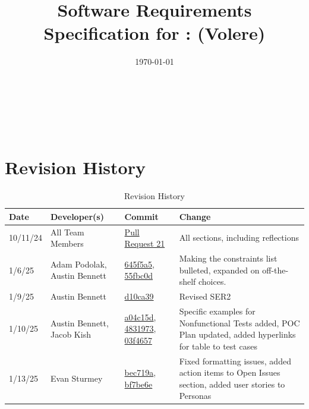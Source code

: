 \documentclass[12pt]{article}
\begin{document}
\title{Software Requirements Specification for \progname: (Volere)} 
\author{\authname}
\date{\today}
	
\maketitle

~\newpage


\tableofcontents

~\newpage

\section*{Revision History}

\begin{table}[H]
\centering
\caption{Revision History}
\label{TblRevisionHistory}
\begin{tabularx}{\textwidth}{p{} p{} p{} p{}}
\toprule
\textbf{Date} & \textbf{Developer(s)} & \textbf{Commit} & \textbf{Change}\\

\midrule
10/11/24 & 
All Team Members & 
\href{https://github.com/ausbennett/mes-finance-platform/pull/21}{Pull Request 21} & 
All sections, including reflections\\

\midrule
1/6/25 & 
Adam Podolak, Austin Bennett & 
\href{https://github.com/ausbennett/mes-finance-platform/commit/645f5a5ecfee7cc2adbb784888d733d815d3080f}{645f5a5}, \href{https://github.com/ausbennett/mes-finance-platform/commit/55fbc0d26a10b56f90c50919de7a8c9ca920ec11}{55fbc0d}  & Making the constraints list bulleted, expanded on off-the-shelf choices. \\

\midrule
1/9/25 & 
Austin Bennett & 
\href{https://github.com/ausbennett/mes-finance-platform/commit/d10ca390135f3c6f5a7b2c8f237c3575501a2a7f}{d10ca39} & 
Revised SER2\\

\midrule
1/10/25 & 
Austin Bennett, Jacob Kish & 
\href{https://github.com/ausbennett/mes-finance-platform/commit/a04c15d0b1c09c4224c563c3293413720992000f}{a04c15d}, 
\href{https://github.com/ausbennett/mes-finance-platform/commit/4831973b5533e5ae9d6ae4e884bd0cfebb49792d}{4831973},
\href{https://github.com/ausbennett/mes-finance-platform/commit/03f46579d128fbf9c896b3c4cba2601181f4d5c1}{03f4657} & 
Specific examples for Nonfunctional Tests added, POC Plan updated, added hyperlinks for table to test cases\\

\midrule
1/13/25 & 
Evan Sturmey & 
\href{https://github.com/ausbennett/mes-finance-platform/commit/bec719a678c2e216e68564fe8e70e5d8c9853035}{bec719a},
\href{https://github.com/ausbennett/mes-finance-platform/commit/bf7be6e379e0efa3128f5f5989a94023b1278a87}{bf7be6e} & 
Fixed formatting issues, added action items to Open Issues section, added user stories to Personas\\

\bottomrule
\end{tabularx}
\end{table}
\end{document}
